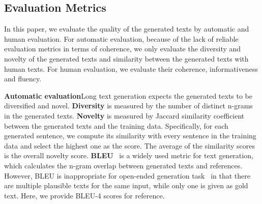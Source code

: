 \documentclass[letterpaper]{article} %
\begin{document}
\subsection{Evaluation Metrics}
In this paper, we evaluate the quality of the generated texts by automatic and human evaluation. For automatic evaluation, because of the lack of reliable evaluation metrics in terms of coherence, we only evaluate the diversity and novelty of the generated texts and similarity between the generated texts with human texts. For human evaluation, we evaluate their coherence, informativeness and fluency.

\medskip\noindent\textbf{Automatic evaluation}\hspace{1em}Long text generation expects the generated texts to be diversified and novel. 
\textbf{Diversity} is measured by the number of distinct n-grams in the generated texts. 
\textbf{Novelty} is measured by Jaccard similarity coefficient~\citep{niwattanakul2013using} between the generated texts and the training data.  Specifically, for each generated sentence, we compute its similarity with every sentence in the training data and select the highest one as the score. The average of the similarity scores is the overall novelty score. \textbf{BLEU}~\citep{BLEU} is a widely used metric for text generation, which calculates the n-gram overlap between generated texts and references. However, BLEU is inappropriate for open-ended generation task~\citep{fan_story_generation} in that there are multiple plausible texts for the same input, while only one is given as gold text. Here, we provide BLEU-4 scores for reference.
\end{document}
